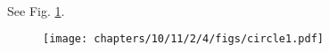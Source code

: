 	\\
	\solution See Fig. 
		\ref{fig:10/11/2/4}.
	\begin{figure}[H]
		\centering
 \texttt{[image: chapters/10/11/2/4/figs/circle1.pdf]}
		\caption{}
		\label{fig:10/11/2/4}
  	\end{figure}
